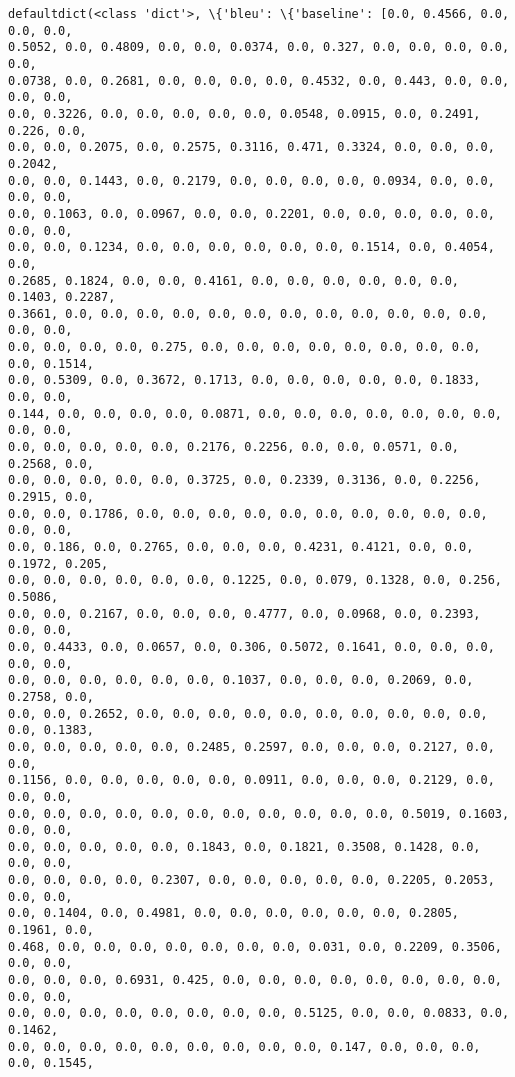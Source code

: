 \documentclass[11pt]{article}
\begin{document}
    \begin{Verbatim}[commandchars=\\\{\}]
defaultdict(<class 'dict'>, \{'bleu': \{'baseline': [0.0, 0.4566, 0.0, 0.0, 0.0,
0.5052, 0.0, 0.4809, 0.0, 0.0, 0.0374, 0.0, 0.327, 0.0, 0.0, 0.0, 0.0, 0.0,
0.0738, 0.0, 0.2681, 0.0, 0.0, 0.0, 0.0, 0.4532, 0.0, 0.443, 0.0, 0.0, 0.0, 0.0,
0.0, 0.3226, 0.0, 0.0, 0.0, 0.0, 0.0, 0.0548, 0.0915, 0.0, 0.2491, 0.226, 0.0,
0.0, 0.0, 0.2075, 0.0, 0.2575, 0.3116, 0.471, 0.3324, 0.0, 0.0, 0.0, 0.2042,
0.0, 0.0, 0.1443, 0.0, 0.2179, 0.0, 0.0, 0.0, 0.0, 0.0934, 0.0, 0.0, 0.0, 0.0,
0.0, 0.1063, 0.0, 0.0967, 0.0, 0.0, 0.2201, 0.0, 0.0, 0.0, 0.0, 0.0, 0.0, 0.0,
0.0, 0.0, 0.1234, 0.0, 0.0, 0.0, 0.0, 0.0, 0.0, 0.1514, 0.0, 0.4054, 0.0,
0.2685, 0.1824, 0.0, 0.0, 0.4161, 0.0, 0.0, 0.0, 0.0, 0.0, 0.0, 0.1403, 0.2287,
0.3661, 0.0, 0.0, 0.0, 0.0, 0.0, 0.0, 0.0, 0.0, 0.0, 0.0, 0.0, 0.0, 0.0, 0.0,
0.0, 0.0, 0.0, 0.0, 0.275, 0.0, 0.0, 0.0, 0.0, 0.0, 0.0, 0.0, 0.0, 0.0, 0.1514,
0.0, 0.5309, 0.0, 0.3672, 0.1713, 0.0, 0.0, 0.0, 0.0, 0.0, 0.1833, 0.0, 0.0,
0.144, 0.0, 0.0, 0.0, 0.0, 0.0871, 0.0, 0.0, 0.0, 0.0, 0.0, 0.0, 0.0, 0.0, 0.0,
0.0, 0.0, 0.0, 0.0, 0.0, 0.2176, 0.2256, 0.0, 0.0, 0.0571, 0.0, 0.2568, 0.0,
0.0, 0.0, 0.0, 0.0, 0.0, 0.3725, 0.0, 0.2339, 0.3136, 0.0, 0.2256, 0.2915, 0.0,
0.0, 0.0, 0.1786, 0.0, 0.0, 0.0, 0.0, 0.0, 0.0, 0.0, 0.0, 0.0, 0.0, 0.0, 0.0,
0.0, 0.186, 0.0, 0.2765, 0.0, 0.0, 0.0, 0.4231, 0.4121, 0.0, 0.0, 0.1972, 0.205,
0.0, 0.0, 0.0, 0.0, 0.0, 0.0, 0.1225, 0.0, 0.079, 0.1328, 0.0, 0.256, 0.5086,
0.0, 0.0, 0.2167, 0.0, 0.0, 0.0, 0.4777, 0.0, 0.0968, 0.0, 0.2393, 0.0, 0.0,
0.0, 0.4433, 0.0, 0.0657, 0.0, 0.306, 0.5072, 0.1641, 0.0, 0.0, 0.0, 0.0, 0.0,
0.0, 0.0, 0.0, 0.0, 0.0, 0.0, 0.1037, 0.0, 0.0, 0.0, 0.2069, 0.0, 0.2758, 0.0,
0.0, 0.0, 0.2652, 0.0, 0.0, 0.0, 0.0, 0.0, 0.0, 0.0, 0.0, 0.0, 0.0, 0.0, 0.1383,
0.0, 0.0, 0.0, 0.0, 0.0, 0.2485, 0.2597, 0.0, 0.0, 0.0, 0.2127, 0.0, 0.0,
0.1156, 0.0, 0.0, 0.0, 0.0, 0.0, 0.0911, 0.0, 0.0, 0.0, 0.2129, 0.0, 0.0, 0.0,
0.0, 0.0, 0.0, 0.0, 0.0, 0.0, 0.0, 0.0, 0.0, 0.0, 0.0, 0.5019, 0.1603, 0.0, 0.0,
0.0, 0.0, 0.0, 0.0, 0.0, 0.1843, 0.0, 0.1821, 0.3508, 0.1428, 0.0, 0.0, 0.0,
0.0, 0.0, 0.0, 0.0, 0.2307, 0.0, 0.0, 0.0, 0.0, 0.0, 0.2205, 0.2053, 0.0, 0.0,
0.0, 0.1404, 0.0, 0.4981, 0.0, 0.0, 0.0, 0.0, 0.0, 0.0, 0.2805, 0.1961, 0.0,
0.468, 0.0, 0.0, 0.0, 0.0, 0.0, 0.0, 0.0, 0.031, 0.0, 0.2209, 0.3506, 0.0, 0.0,
0.0, 0.0, 0.0, 0.6931, 0.425, 0.0, 0.0, 0.0, 0.0, 0.0, 0.0, 0.0, 0.0, 0.0, 0.0,
0.0, 0.0, 0.0, 0.0, 0.0, 0.0, 0.0, 0.0, 0.5125, 0.0, 0.0, 0.0833, 0.0, 0.1462,
0.0, 0.0, 0.0, 0.0, 0.0, 0.0, 0.0, 0.0, 0.0, 0.147, 0.0, 0.0, 0.0, 0.0, 0.1545,

\end{Verbatim}
\end{document}
